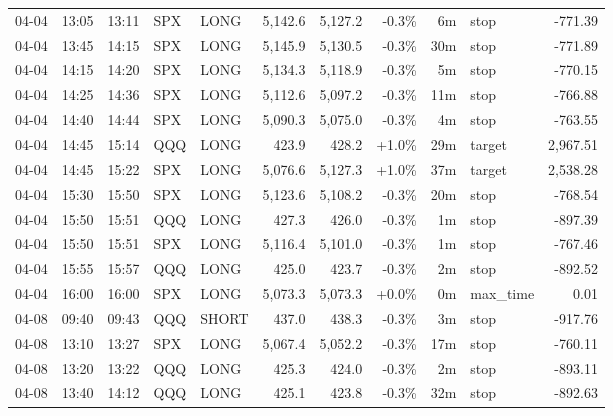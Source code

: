\documentclass[11pt,a4paper,twoside]{article}
\begin{document}
\begin{center}
\begin{longtable}{>{\color{txtmain}}l l l l l r r r r >{\color{txtmain}}l r}
04-04 & 13:05 & 13:11 & SPX & LONG & 5,142.6 & 5,127.2 & \textcolor{lossred}{-0.3\%} & 6m & stop & \textcolor{lossred}{-771.39} \\
04-04 & 13:45 & 14:15 & SPX & LONG & 5,145.9 & 5,130.5 & \textcolor{lossred}{-0.3\%} & 30m & stop & \textcolor{lossred}{-771.89} \\
04-04 & 14:15 & 14:20 & SPX & LONG & 5,134.3 & 5,118.9 & \textcolor{lossred}{-0.3\%} & 5m & stop & \textcolor{lossred}{-770.15} \\
04-04 & 14:25 & 14:36 & SPX & LONG & 5,112.6 & 5,097.2 & \textcolor{lossred}{-0.3\%} & 11m & stop & \textcolor{lossred}{-766.88} \\
04-04 & 14:40 & 14:44 & SPX & LONG & 5,090.3 & 5,075.0 & \textcolor{lossred}{-0.3\%} & 4m & stop & \textcolor{lossred}{-763.55} \\
04-04 & 14:45 & 15:14 & QQQ & LONG & 423.9 & 428.2 & \textcolor{wingreen}{+1.0\%} & 29m & target & \textcolor{wingreen}{2,967.51} \\
04-04 & 14:45 & 15:22 & SPX & LONG & 5,076.6 & 5,127.3 & \textcolor{wingreen}{+1.0\%} & 37m & target & \textcolor{wingreen}{2,538.28} \\
04-04 & 15:30 & 15:50 & SPX & LONG & 5,123.6 & 5,108.2 & \textcolor{lossred}{-0.3\%} & 20m & stop & \textcolor{lossred}{-768.54} \\
04-04 & 15:50 & 15:51 & QQQ & LONG & 427.3 & 426.0 & \textcolor{lossred}{-0.3\%} & 1m & stop & \textcolor{lossred}{-897.39} \\
04-04 & 15:50 & 15:51 & SPX & LONG & 5,116.4 & 5,101.0 & \textcolor{lossred}{-0.3\%} & 1m & stop & \textcolor{lossred}{-767.46} \\
04-04 & 15:55 & 15:57 & QQQ & LONG & 425.0 & 423.7 & \textcolor{lossred}{-0.3\%} & 2m & stop & \textcolor{lossred}{-892.52} \\
04-04 & 16:00 & 16:00 & SPX & LONG & 5,073.3 & 5,073.3 & \textcolor{wingreen}{+0.0\%} & 0m & max\_time & \textcolor{wingreen}{0.01} \\
04-08 & 09:40 & 09:43 & QQQ & SHORT & 437.0 & 438.3 & \textcolor{lossred}{-0.3\%} & 3m & stop & \textcolor{lossred}{-917.76} \\
04-08 & 13:10 & 13:27 & SPX & LONG & 5,067.4 & 5,052.2 & \textcolor{lossred}{-0.3\%} & 17m & stop & \textcolor{lossred}{-760.11} \\
04-08 & 13:20 & 13:22 & QQQ & LONG & 425.3 & 424.0 & \textcolor{lossred}{-0.3\%} & 2m & stop & \textcolor{lossred}{-893.11} \\
04-08 & 13:40 & 14:12 & QQQ & LONG & 425.1 & 423.8 & \textcolor{lossred}{-0.3\%} & 32m & stop & \textcolor{lossred}{-892.63} \\

\end{longtable}
\end{center}
\end{document}
